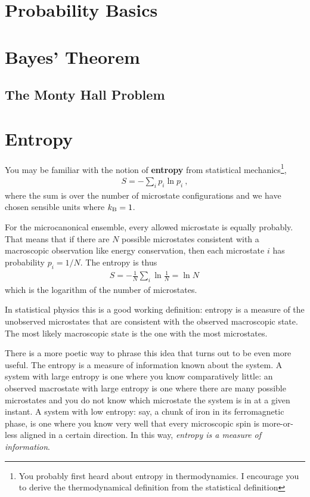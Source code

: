 
\section{Probability Basics}

\section{Bayes' Theorem}

\subsection{The Monty Hall Problem}

\section{Entropy} 

You may be familiar with the notion of \textbf{entropy} from statistical mechanics\footnote{You probably first heard about entropy in thermodynamics. I encourage you to derive the thermodynamical definition from the statistical definition},
\begin{align}
  S = -\sum_i p_i \ln p_i \ ,
\end{align}
where the sum is over the number of microstate configurations and we have chosen sensible units where $k_\textnormal{B} =1$. 
\begin{example}
For the microcanonical ensemble, every allowed microstate is equally probably. That means that if there are $N$ possible microstates consistent with a macroscopic observation like energy conservation, then each microstate $i$ has probability $p_i = 1/N$. The entropy is thus
\begin{align}
  S = -\frac{1}{N}\sum_i \ln \frac{1}{N} = \ln N \,
\end{align}
which is the logarithm of the number of microstates.
\end{example}
In statistical physics this is a good working definition: entropy is a measure of the unobserved microstates that are consistent with the observed macroscopic state. The most likely macroscopic state is the one with the most microstates. 

There is a more poetic way to phrase this idea that turns out to be even more useful. The entropy is a measure of information known about the system. A system with large entropy is one where you know comparatively little: an observed macrostate with large entropy is one where there are many possible microstates and you do not know which microstate the system is in at a given instant. A system with low entropy: say, a chunk of iron in its ferromagnetic phase, is one where you know very well that every microscopic spin is more-or-less aligned in a certain direction. In this way, \emph{entropy is a measure of information}.

